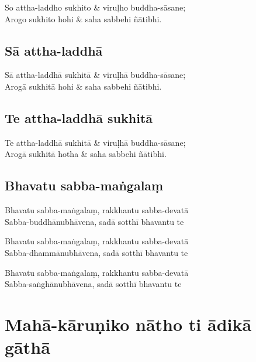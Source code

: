 \begin{twochants}
So attha-laddho sukhito & viruḷho buddha-sāsane;\\
Arogo sukhito hohi & saha sabbehi ñātibhi.\\
\end{twochants}

\subsection{Sā attha-laddhā}


\begin{twochants}
Sā attha-laddhā sukhitā & viruḷhā buddha-sāsane;\\
Arogā sukhitā hohi & saha sabbehi ñātibhi.\\
\end{twochants}

\subsection{Te attha-laddhā sukhitā}
\label{te-attha-laddha}


\begin{twochants}
Te attha-laddhā sukhitā & viruḷhā buddha-sāsane;\\
Arogā sukhitā hotha & saha sabbehi ñātibhi.
\end{twochants}


\subsection{Bhavatu sabba-maṅgalaṃ}
\label{bhavatu}


Bhavatu sabba-maṅgalaṃ, rakkhantu sabba-devatā\\
Sabba-buddhānubhāvena, sadā sotthī bhavantu te

Bhavatu sabba-maṅgalaṃ, rakkhantu sabba-devatā\\
Sabba-dhammānubhāvena, sadā sotthī bhavantu te

Bhavatu sabba-maṅgalaṃ, rakkhantu sabba-devatā\\
Sabba-saṅghānubhāvena, sadā sotthī bhavantu te

\section{Mahā-kāruṇiko nātho ti ādikā gāthā}

